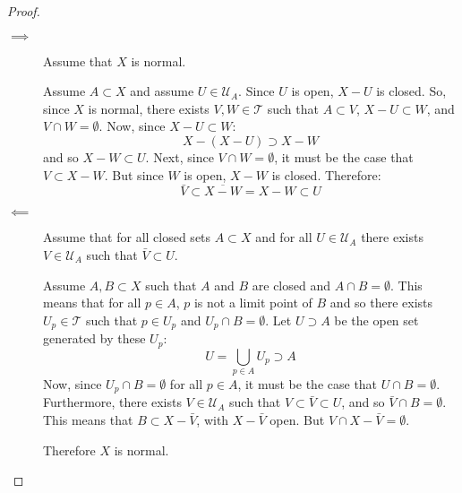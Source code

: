 \documentclass[letterpaper,12pt,fleqn]{article}
\newcommand{\T}{\mathscr{T}}
\newcommand{\U}{\mathcal{U}}
\begin{document}
\begin{proof}
  \begin{description}
  \item[]
  \item[\(\implies\)] Assume that \(X\) is normal.

    Assume \(A\subset X\) and assume \(U\in\U_A\).  Since \(U\) is open, \(X-U\) is closed.  So, since \(X\) is
    normal, there exists \(V,W\in\T\) such that \(A\subset V\), \(X-U\subset W\), and \(V\cap W=\emptyset\).
    Now, since \(X-U\subset W\):
    \[X-(X-U)\supset X-W\]
    and so \(X-W\subset U\).  Next, since \(V\cap W=\emptyset\), it must be the case that \(V\subset X-W\).  But
    since \(W\) is open, \(X-W\) is closed.  Therefore:
    \[\bar{V}\subset\overline{X-W}=X-W\subset U\]

  \item[\(\impliedby\)] Assume that for all closed sets \(A\subset X\) and for all \(U\in\U_A\)
    there exists \(V\in\U_A\) such that \(\bar{V}\subset U\).

    Assume \(A,B\subset X\) such that \(A\) and \(B\) are closed and \(A\cap B=\emptyset\).  This means that for all
    \(p\in A\), \(p\) is not a limit point of \(B\) and so there exists \(U_p\in\T\) such that \(p\in U_p\) and
    \(U_p\cap B=\emptyset\).  Let \(U\supset A\) be the open set generated by these \(U_p\):
    \[U=\bigcup_{p\in A}U_p\supset A\]
    Now, since \(U_p\cap B=\emptyset\) for all \(p\in A\), it must be the case that \(U\cap B=\emptyset\).
    Furthermore, there exists \(V\in\U_A\) such that \(V\subset\bar{V}\subset U\), and so \(\bar{V}\cap
    B=\emptyset\).  This means that \(B\subset X-\bar{V}\), with \(X-\bar{V}\) open.  But \(V\cap
    X-\bar{V}=\emptyset\).

    Therefore \(X\) is normal.
  \end{description}
\end{proof}
\end{document}
